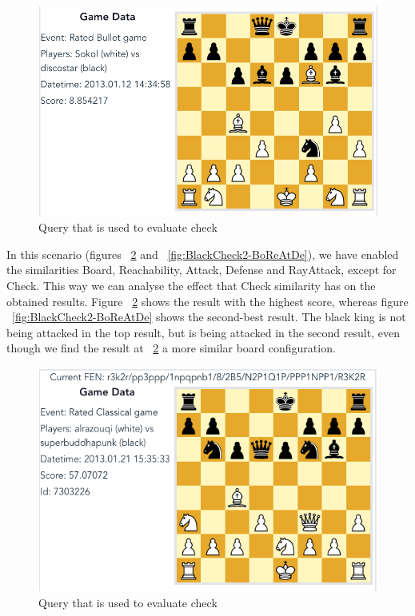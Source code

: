 \documentclass[11pt]{article}
\begin{document}
    \begin{figure}[H]
        \centering
        \includegraphics[width=12cm]{images/BlackCheck2-Bo}
        \caption{Query that is used to evaluate check}
        \label{fig:BlackCheck2-Bo}
    \end{figure}

    In this scenario (figures ~\ref{fig:BlackCheck1-BoReAtDe} and ~\ref{fig:BlackCheck2-BoReAtDe}), we have enabled the similarities Board, Reachability, Attack, Defense and RayAttack, except for Check. This way we can analyse the effect that Check similarity has on the obtained results. Figure ~\ref{fig:BlackCheck1-BoReAtDe} shows the result with the highest score, whereas figure ~\ref{fig:BlackCheck2-BoReAtDe} shows the second-best result. The black king is not being attacked in the top result, but is being attacked in the second result, even though we find the result at ~\ref{fig:BlackCheck1-BoReAtDe} a more similar board configuration.

    \begin{figure}[H]
        \centering
        \includegraphics[width=12cm]{images/BlackCheck1-BoReAtDe}
        \caption{Query that is used to evaluate check}
        \label{fig:BlackCheck1-BoReAtDe}
    \end{figure}
\end{document}
